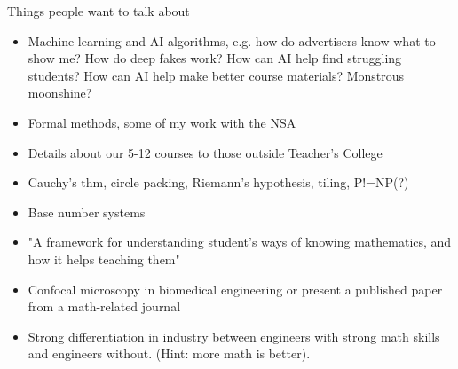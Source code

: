 \documentclass[english,t]{beamer}
\begin{document}
\begin{frame}{Things people want to talk about} \label{slide-8}
    \begin{itemize} \small
        \item Machine learning and AI algorithms, e.g. how do advertisers know what to show me? How do deep fakes work? How can AI help find struggling students? How can AI help make better course materials? Monstrous moonshine?
        \item Formal methods, some of my work with the NSA
        \item Details about our 5-12 courses to those outside Teacher's College
        \item  Cauchy's thm, circle packing, Riemann's hypothesis, tiling, P!=NP(?) 
        \item Base number systems
        \item "A framework for understanding student's ways of knowing mathematics, and how it helps teaching them"
        \item Confocal microscopy in biomedical engineering or present a published paper from a math-related journal
        \item Strong differentiation in industry between engineers with strong math skills and engineers without. (Hint: more math is better).
    \end{itemize}
\end{frame}
\end{document}
